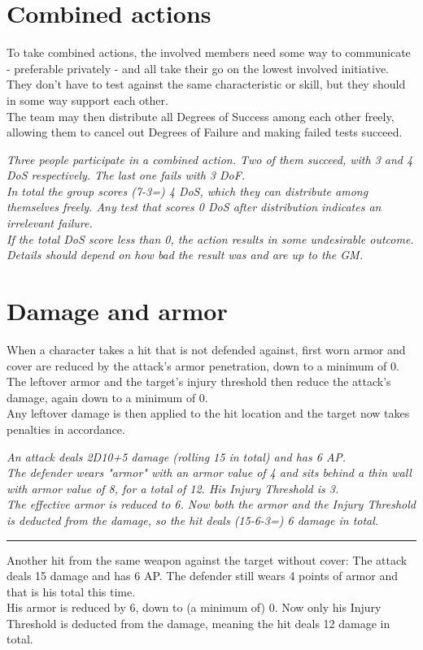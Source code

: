\section{Combined actions}
\label{combinedaction}
To take combined actions, the involved members need some way to communicate - preferable privately - and all take their go on the lowest involved initiative. They don't have to test against the same characteristic or skill, but they should in some way support each other.\\
The team may then distribute all Degrees of Success among each other freely, allowing them to cancel out Degrees of Failure and making failed tests succeed.
\begin{exampleblock}
	\itshape
	Three people participate in a combined action. Two of them succeed, with 3 and 4 DoS respectively. The last one fails with 3 DoF.\\
	In total the group scores (7-3=) 4 DoS,
		which they can distribute among themselves freely.
	Any test that scores 0 DoS after distribution indicates an irrelevant failure.
	\\%
	If the total DoS score less than 0,
		the action results in some undesirable outcome.
	Details should depend on how bad the result was
		and are up to the GM.
\end{exampleblock}
\section{Damage and armor}
When a character takes a hit that is not defended against, first worn armor and cover are reduced by the attack's armor penetration, down to a minimum of 0. \\
The leftover armor and the target’s injury threshold then reduce the attack’s damage, again down to a minimum of 0. \\
Any leftover damage is then applied to the hit location
	and the target now takes penalties in accordance.
\begin{exampleblock}
	\itshape
	An attack deals 2D10+5 damage (rolling 15 in total) and has 6 AP.\\
	The defender wears "armor" with an armor value of 4 and sits behind a thin wall with armor value of 8, for a total of 12. His Injury Threshold is 3.\\
	The effective armor is reduced to 6. Now both the armor and the Injury Threshold is deducted from the damage, so the hit deals (15-6-3=) 6 damage in total.
	\par
	\vspace{2mm}
	\hrule
	\vspace{2mm}
	Another hit from the same weapon against the target without cover:
	The attack deals 15 damage and has 6 AP.
	The defender still wears 4 points of armor and that is his total this time.
	\\%
	His armor is reduced by 6, down to (a minimum of) 0.
	Now only his Injury Threshold is deducted from the damage,
		meaning the hit deals 12 damage in total.
\end{exampleblock}
